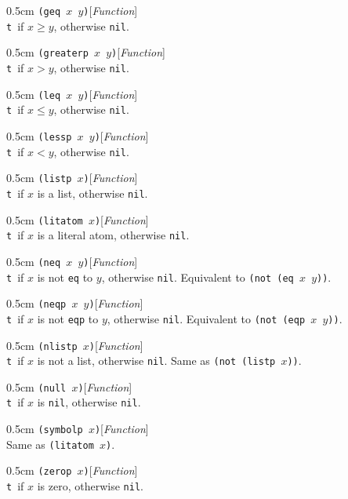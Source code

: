 \documentclass[a4paper]{article}
\newcommand{\lisp}[1]{\texttt{#1}}
\newcommand{\T}{\lisp{t}}
\newcommand{\NIL}{\lisp{nil}}
\newenvironment{defun}[2]{\begin{adjustwidth}{0.5cm}{}
    {\hspace*{-0.5cm}\lisp{#2}\hfill[\textit{#1}]\\}}
               {\end{adjustwidth}}
\begin{document}
\begin{defun}{Function}{(geq $x$ $y$)}
  \T\ if $x \ge y$, otherwise \NIL.
\end{defun}

\begin{defun}{Function}{(greaterp $x$ $y$)}
  \T\ if $x > y$, otherwise \NIL.
\end{defun}


\begin{defun}{Function}{(leq $x$ $y$)}
  \T\ if $x \le y$, otherwise \NIL.
\end{defun}

\begin{defun}{Function}{(lessp $x$ $y$)}
  \T\ if $x < y$, otherwise \NIL.
\end{defun}

\begin{defun}{Function}{(listp $x$)}
  \T\ if $x$ is a list, otherwise \NIL.
\end{defun}

\begin{defun}{Function}{(litatom $x$)}
  \T\ if $x$ is a literal atom, otherwise \NIL.
\end{defun}

\begin{defun}{Function}{(neq $x$ $y$)}
  \T\ if $x$ is not \lisp{eq} to $y$, otherwise \NIL. Equivalent to
  \lisp{(not (eq $x$ $y$))}.
\end{defun}

\begin{defun}{Function}{(neqp $x$ $y$)}
  \T\ if $x$ is not \lisp{eqp} to $y$, otherwise \NIL. Equivalent to
  \lisp{(not (eqp $x$ $y$))}.
\end{defun}

\begin{defun}{Function}{(nlistp $x$)}
  \T\ if $x$ is not a list, otherwise \NIL. Same as \lisp{(not (listp
    $x$))}.
\end{defun}

\begin{defun}{Function}{(null $x$)}
  \T\ if $x$ is \NIL, otherwise \NIL.
\end{defun}

\begin{defun}{Function}{(symbolp $x$)}
  Same as \lisp{(litatom $x$)}.
\end{defun}

\begin{defun}{Function}{(zerop $x$)}
  \T\ if $x$ is zero, otherwise \NIL.
\end{defun}
\end{document}
